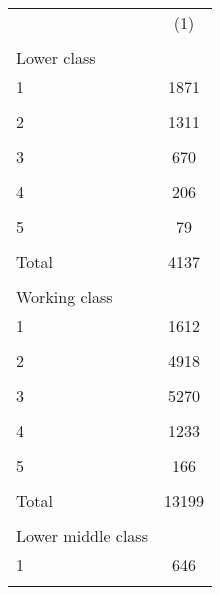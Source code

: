 {
\def\sym#1{\ifmmode^{#1}\else\(^{#1}\)\fi}
\begin{tabular}{l*{1}{c}}
\hline\hline
            &\multicolumn{1}{c}{(1)}\\
            &\multicolumn{1}{c}{} \\
\hline
Lower class &                     \\
1           &        1871         \\
            &                     \\
[1em]
2           &        1311         \\
            &                     \\
[1em]
3           &         670         \\
            &                     \\
[1em]
4           &         206         \\
            &                     \\
[1em]
5           &          79         \\
            &                     \\
[1em]
Total       &        4137         \\
            &                     \\
\hline
Working class&                     \\
1           &        1612         \\
            &                     \\
[1em]
2           &        4918         \\
            &                     \\
[1em]
3           &        5270         \\
            &                     \\
[1em]
4           &        1233         \\
            &                     \\
[1em]
5           &         166         \\
            &                     \\
[1em]
Total       &       13199         \\
            &                     \\
\hline
Lower middle class&                     \\
1           &         646         \\
            &                     \\

\end{tabular}}
